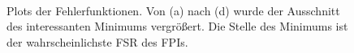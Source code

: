 \begin{figure}[h]
{{{		}\\
	}}
	\caption[FSR-Bestimmung]{Plots der Fehlerfunktionen. Von (a) nach (d) wurde der
	Ausschnitt des interessanten Minimums vergrößert. Die Stelle des Minimums ist
	der wahrscheinlichste FSR des FPIs.}
	\label{fig:nonius_FSR_messung}
\end{figure}


